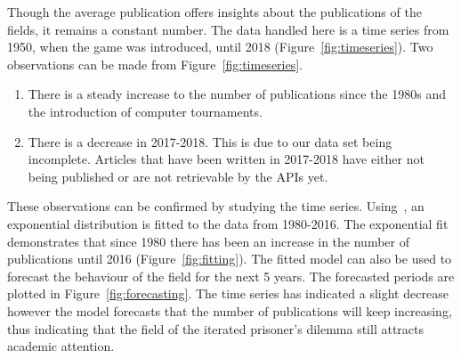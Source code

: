 \documentclass{article}
\theoremstyle{definition}
\begin{document}
Though the average publication offers insights about the publications of the
fields, it remains a constant number. The data handled here is a time
series from 1950, when the game was introduced, until 2018 (Figure~\ref{fig:timeseries}). 
Two observations can be made from Figure~\ref{fig:timeseries}.

\begin{enumerate}
    \item There is a steady increase to the number of publications since the
    1980s and the introduction of computer tournaments.
    \item There is a decrease in 2017-2018. This is due to our data set being
    incomplete. Articles that have been written in 2017-2018 have either not
    being published or are not retrievable by the APIs yet.
\end{enumerate}

These observations can be confirmed by studying the time series.
Using~\cite{scipy}, an exponential distribution is fitted to the data from
1980-2016. The exponential fit demonstrates that since 1980 there has been an
increase in the number of publications until 2016 (Figure~\ref{fig:fitting}).
The fitted model can also be used to forecast the behaviour of the field for the
next 5 years. The forecasted periods are plotted in
Figure~\ref{fig:forecasting}. The time series has indicated a slight decrease
however the model forecasts that the number of publications will keep
increasing, thus indicating that the field of the iterated prisoner's dilemma
still attracts academic attention.
\end{document}
